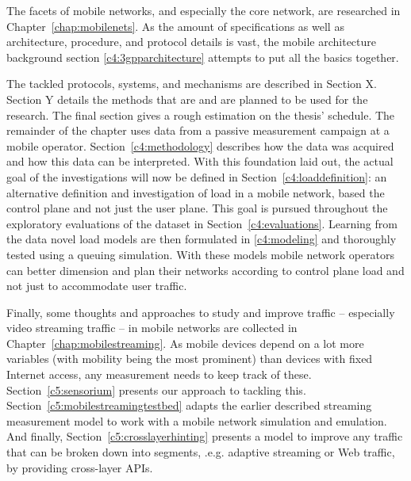 The facets of mobile networks, and especially the core network, are researched in Chapter~\ref{chap:mobilenets}. As the amount of specifications as well as architecture, procedure, and protocol details is vast, the mobile architecture background section \ref{c4:3gpparchitecture} attempts to put all the basics together. 

The tackled protocols, systems, and mechanisms are described in Section X. Section Y details the methods that are and are planned to be used for the research. The final section gives a rough estimation on the thesis' schedule. The remainder of the chapter uses data from a passive measurement campaign at a mobile operator. Section~\ref{c4:methodology} describes how the data was acquired and how this data can be interpreted. With this foundation laid out, the actual goal of the investigations will now be defined in Section~\ref{c4:loaddefinition}: an alternative definition and investigation of load in a mobile network, based the control plane and not just the user plane. This goal is pursued throughout the exploratory evaluations of the dataset in Section~\ref{c4:evaluations}. Learning from the data novel load models are then formulated in \ref{c4:modeling} and thoroughly tested using a queuing simulation. With these models mobile network operators can better dimension and plan their networks according to control plane load and not just to accommodate user traffic.


Finally, some thoughts and approaches to study and improve traffic -- especially video streaming traffic -- in mobile networks are collected in Chapter~\ref{chap:mobilestreaming}.  As mobile devices depend on a lot more variables (with mobility being the most prominent) than devices with fixed Internet access, any measurement needs to keep track of these. Section~\ref{c5:sensorium} presents our approach to tackling this.
Section~\ref{c5:mobilestreamingtestbed} adapts the earlier described streaming measurement model to work with a mobile network simulation and emulation.
And finally, Section~\ref{c5:crosslayerhinting} presents a model to improve any traffic that can be broken down into segments, .e.g. adaptive streaming or Web traffic, by providing cross-layer \glspl{API}.




